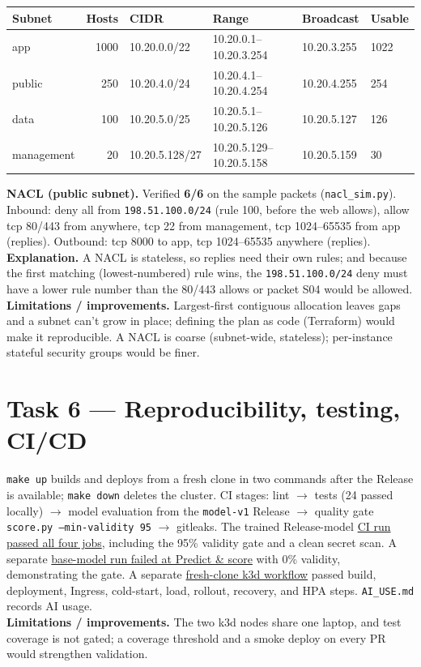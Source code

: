 \documentclass[10pt,a4paper]{article}
\newcommand{\code}[1]{\texttt{\small #1}}
\begin{document}
\begin{center}\small
\begin{tabular}{lrllll}
\toprule
Subnet & Hosts & CIDR & Range & Broadcast & Usable \\
\midrule
app & 1000 & 10.20.0.0/22 & 10.20.0.1--10.20.3.254 & 10.20.3.255 & 1022 \\
public & 250 & 10.20.4.0/24 & 10.20.4.1--10.20.4.254 & 10.20.4.255 & 254 \\
data & 100 & 10.20.5.0/25 & 10.20.5.1--10.20.5.126 & 10.20.5.127 & 126 \\
management & 20 & 10.20.5.128/27 & 10.20.5.129--10.20.5.158 & 10.20.5.159 & 30 \\
\bottomrule
\end{tabular}
\end{center}

\noindent\textbf{NACL (public subnet).} Verified \textbf{6/6} on the sample packets (\code{nacl\_sim.py}).
Inbound: deny all from \code{198.51.100.0/24} (rule 100, before the web allows), allow tcp 80/443 from
anywhere, tcp 22 from management, tcp 1024--65535 from app (replies). Outbound: tcp 8000 to app, tcp
1024--65535 anywhere (replies). \textbf{Explanation.} A NACL is stateless, so replies need their own rules;
and because the first matching (lowest-numbered) rule wins, the \code{198.51.100.0/24} deny must have a
lower rule number than the 80/443 allows or packet S04 would be allowed.\\
\textbf{Limitations / improvements.} Largest-first contiguous allocation leaves gaps and a subnet can't grow
in place; defining the plan as code (Terraform) would make it reproducible. A NACL is coarse (subnet-wide,
stateless); per-instance stateful security groups would be finer.

\clearpage
\section{Task 6 --- Reproducibility, testing, CI/CD}
\code{make up} builds and deploys from a fresh clone in two commands after the Release is available;
\code{make down} deletes the cluster. CI stages: lint $\rightarrow$ tests (24 passed locally)
$\rightarrow$ model evaluation from the \code{model-v1} Release $\rightarrow$ quality gate
\code{score.py --min-validity 95} $\rightarrow$ gitleaks. The trained Release-model
\href{https://github.com/ABHISHEK27Y/CS3081-CLOUD-PROJECT/actions/runs/42230797041}{CI run passed all four jobs},
including the 95\% validity gate and a clean secret scan. A separate
\href{https://github.com/ABHISHEK27Y/CS3081-CLOUD-PROJECT/actions/runs/42219523454}{base-model run failed at Predict \& score}
with 0\% validity, demonstrating the gate. A separate
\href{https://github.com/ABHISHEK27Y/CS3081-CLOUD-PROJECT/actions/runs/42219651934}{fresh-clone k3d workflow}
passed build, deployment, Ingress, cold-start, load, rollout, recovery, and HPA steps.
\code{AI\_USE.md} records AI usage.\\
\textbf{Limitations / improvements.} The two k3d nodes share one laptop, and test coverage is not gated;
a coverage threshold and a smoke deploy on every PR would strengthen validation.
\end{document}
